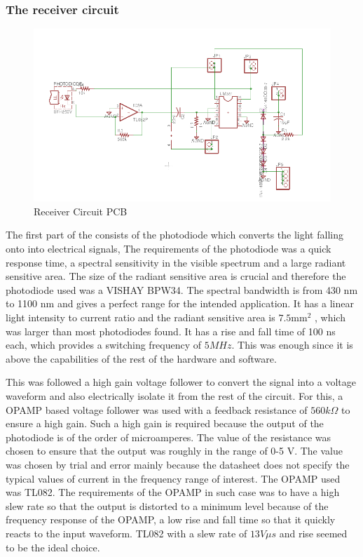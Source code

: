 \documentclass{article}
\begin{document}
\subsubsection{The receiver circuit}
\begin{figure}[h]
  \centering
  \includegraphics[scale=0.5]{images/receiver_sch}
  \caption{Receiver Circuit PCB}
  \label{fig:rx_circuit}
\end{figure}
The first part of the consists of the photodiode which converts the light falling onto into electrical signals, The requirements of the photodiode was a quick response time, a spectral sensitivity in the visible spectrum and a large radiant sensitive area. The size of the
radiant sensitive area is crucial and therefore the photodiode used was a VISHAY BPW34. The spectral bandwidth is from 430 nm to 1100 nm and gives a perfect range for the intended application. It has a linear light intensity to current ratio and the radiant sensitive area is $7.5 \text{mm}^2$ , which was larger than most photodiodes found. It has a rise
and fall time of 100 ns each, which provides a switching frequency of $5 MHz$. This was enough since it is above the capabilities of the rest of the hardware and software.

This was followed a high gain voltage follower to convert the signal into a voltage waveform and also electrically isolate it from the rest of the circuit. For this, a OPAMP based voltage follower was used with a feedback resistance of $560 k \Omega$ to ensure a high gain. Such a high gain is required because the output of the photodiode is of the order of microamperes. The value of the resistance was chosen to ensure that the output was roughly in the range of 0-5 V. The value was chosen by trial and error mainly because the datasheet does not specify the typical values of current in the frequency range of interest. The OPAMP used was TL082. The requirements of the OPAMP in such case was to have a high slew rate so that the output is distorted to a minimum level because of the frequency response of the OPAMP, a low rise and fall time so that it quickly reacts to the input waveform. TL082 with a slew rate of $13 V\mu s$ and rise  seemed to be the ideal choice.
\end{document}
